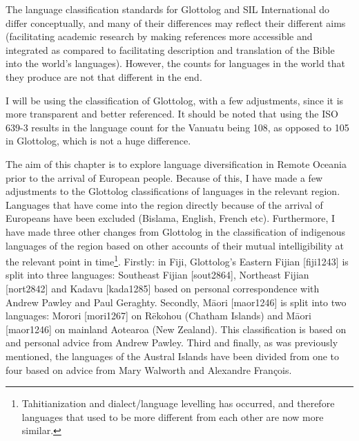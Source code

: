 \documentclass[a4paper,10pt]{article} %
\begin{document}
The language classification standards for Glottolog and SIL International do differ conceptually, and many of their differences may reflect their different aims (facilitating academic research by making references more accessible and integrated as compared to facilitating description and translation of the Bible into the world's languages). However, the counts for languages in the world that they produce are not that different in the end.

I will be using the classification of Glottolog, with a few adjustments, since it is more transparent and better referenced. It should be noted that using the ISO 639-3 results in the language count for the Vanuatu being 108, as opposed to 105 in Glottolog, which is not a huge difference. 

The aim of this chapter is to explore language diversification in Remote Oceania prior to the arrival of European people. Because of this, I have made a few adjustments to the Glottolog classifications of languages in the relevant region. Languages that have come into the region directly because of the arrival of Europeans have been excluded (Bislama, English, French etc). Furthermore, I have made three other changes from Glottolog in the classification of indigenous languages of the region based on other accounts of their mutual intelligibility at the relevant point in time\footnote{Tahitianization and dialect/language levelling has occurred, and therefore languages that used to be more different from each other are now more similar.}. Firstly: in Fiji, Glottolog's Eastern Fijian [fiji1243] is split into three languages: Southeast Fijian [sout2864], Northeast Fijian [nort2842] and Kadavu [kada1285] based on personal correspondence with Andrew Pawley and Paul Geraghty. Secondly, M\={a}ori [maor1246] is split into two languages: Morori [mori1267] on R\={e}kohou (Chatham Islands) and M\={a}ori [maor1246] on mainland Aotearoa (New Zealand). This classification is based on \citet{harlow1973regional} and personal advice from Andrew Pawley. Third and finally, as was previously mentioned, the languages of the Austral Islands have been divided from one to four based on advice from Mary Walworth and Alexandre François.
\end{document}
